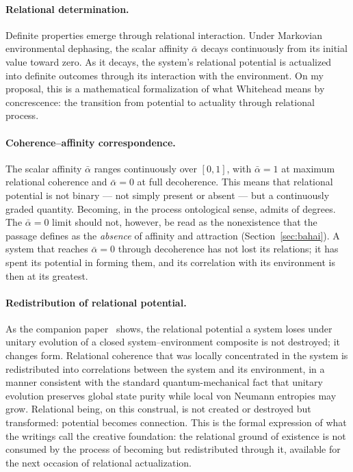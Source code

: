 \paragraph{Relational determination.}
Definite properties emerge through relational interaction.
Under Markovian environmental dephasing, the scalar affinity $\bar\alpha$
decays continuously from its initial value toward zero.
As it decays, the system's relational potential is actualized into
definite outcomes through its interaction with the environment.
On my proposal, this is a mathematical formalization of what Whitehead
means by concrescence: the transition from potential to actuality through
relational process.

\paragraph{Coherence--affinity correspondence.}
The scalar affinity $\bar\alpha$ ranges continuously over $[0,1]$, with
$\bar\alpha = 1$ at maximum relational coherence and $\bar\alpha = 0$ at
full decoherence.
This means that relational potential is not binary --- not simply present
or absent --- but a continuously graded quantity.
Becoming, in the process ontological sense, admits of degrees.
The $\bar\alpha = 0$ limit should not, however, be read as the
nonexistence that the \bahai passage defines as the \emph{absence} of
affinity and attraction (Section~\ref{sec:bahai}).
A system that reaches $\bar\alpha = 0$ through decoherence has not lost
its relations; it has spent its potential in forming them, and its
correlation with its environment is then at its greatest.

\paragraph{Redistribution of relational potential.}
As the companion paper~\citep{Adams2026Physics} shows,
the relational potential a system loses under unitary evolution of a
closed system--environment composite is not destroyed; it changes form.
Relational coherence that was locally concentrated in the system is
redistributed into correlations between the system and its environment,
in a manner consistent with the standard quantum-mechanical fact that
unitary evolution preserves global state purity while local von Neumann
entropies may grow.
Relational being, on this construal, is not created or destroyed but
transformed: potential becomes connection.
This is the formal expression of what the \bahai writings call the
creative foundation: the relational ground of existence is not consumed
by the process of becoming but redistributed through it, available for
the next occasion of relational actualization.


